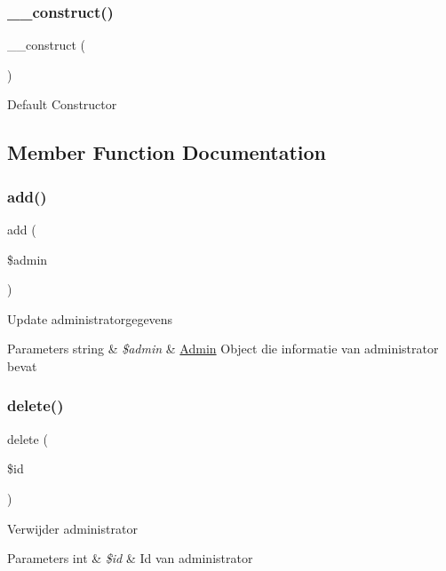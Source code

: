 \subsubsection{\texorpdfstring{\+\_\+\+\_\+construct()}{\_\_construct()}}
{\footnotesize\ttfamily \+\_\+\+\_\+construct (\begin{DoxyParamCaption}{ }\end{DoxyParamCaption})}

Default Constructor 

\subsection{Member Function Documentation}
\mbox{\label{class_beheer__model_a9a6cdec5d258d2b51d1a7619909b2a90}} 
\subsubsection{\texorpdfstring{add()}{add()}}
{\footnotesize\ttfamily add (\begin{DoxyParamCaption}\item[{}]{\$admin }\end{DoxyParamCaption})}

Update administratorgegevens 
\begin{DoxyParams}[1]{Parameters}
string & {\em \$admin} & \mbox{\hyperlink{class_admin}{Admin}} Object die informatie van administrator bevat \\
\hline
\end{DoxyParams}
\mbox{\label{class_beheer__model_a2f8258add505482d7f00ea26493a5723}} 
\subsubsection{\texorpdfstring{delete()}{delete()}}
{\footnotesize\ttfamily delete (\begin{DoxyParamCaption}\item[{}]{\$id }\end{DoxyParamCaption})}

Verwijder administrator 
\begin{DoxyParams}[1]{Parameters}
int & {\em \$id} & Id van administrator \\
\hline
\end{DoxyParams}
\mbox{\label{class_beheer__model_a98d28a4d9a29d40c5a8aa0176f19a919}} 
